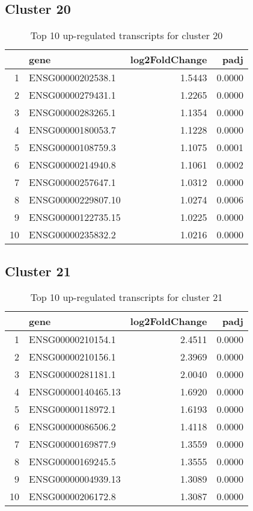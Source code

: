 \documentclass{article}
\begin{document}
\subsection{Cluster 20 }
\begin{table}[H]
\centering
\begin{tabularx}{\textwidth}{rlrr}
  \hline
 & gene & log2FoldChange & padj \\ 
  \hline
1 & ENSG00000202538.1 & 1.5443 & 0.0000 \\ 
  2 & ENSG00000279431.1 & 1.2265 & 0.0000 \\ 
  3 & ENSG00000283265.1 & 1.1354 & 0.0000 \\ 
  4 & ENSG00000180053.7 & 1.1228 & 0.0000 \\ 
  5 & ENSG00000108759.3 & 1.1075 & 0.0001 \\ 
  6 & ENSG00000214940.8 & 1.1061 & 0.0002 \\ 
  7 & ENSG00000257647.1 & 1.0312 & 0.0000 \\ 
  8 & ENSG00000229807.10 & 1.0274 & 0.0006 \\ 
  9 & ENSG00000122735.15 & 1.0225 & 0.0000 \\ 
  10 & ENSG00000235832.2 & 1.0216 & 0.0000 \\ 
   \hline
\end{tabularx}
\caption{Top 10 up-regulated transcripts for cluster 20} 
\label{tab:q3_1_20}
\end{table}
\subsection{Cluster 21 }
\begin{table}[H]
\centering
\begin{tabularx}{\textwidth}{rlrr}
  \hline
 & gene & log2FoldChange & padj \\ 
  \hline
1 & ENSG00000210154.1 & 2.4511 & 0.0000 \\ 
  2 & ENSG00000210156.1 & 2.3969 & 0.0000 \\ 
  3 & ENSG00000281181.1 & 2.0040 & 0.0000 \\ 
  4 & ENSG00000140465.13 & 1.6920 & 0.0000 \\ 
  5 & ENSG00000118972.1 & 1.6193 & 0.0000 \\ 
  6 & ENSG00000086506.2 & 1.4118 & 0.0000 \\ 
  7 & ENSG00000169877.9 & 1.3559 & 0.0000 \\ 
  8 & ENSG00000169245.5 & 1.3555 & 0.0000 \\ 
  9 & ENSG00000004939.13 & 1.3089 & 0.0000 \\ 
  10 & ENSG00000206172.8 & 1.3087 & 0.0000 \\ 
   \hline
\end{tabularx}
\caption{Top 10 up-regulated transcripts for cluster 21} 
\label{tab:q3_1_21}
\end{table}
\end{document}
